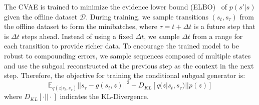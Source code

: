 The CVAE is trained to minimize the evidence lower bound (ELBO)~\citep{kingma2014vae} of $p(s' | s)$ given the offline dataset $\mathcal{D}$. During training, we sample transitions $(s_t, s_{\tau})$ from the offline dataset to form the minibatches, where $\tau = t + \Delta t$ is a future step that is $\Delta t$ steps ahead. Instead of using a fixed $\Delta t$, we sample $\Delta t$ from a range for each transition to provide richer data. To encourage the trained model to be robust to compounding errors, we sample sequences composed of multiple states and use the subgoal reconstructed at the previous step as the context in the next step. Therefore, the objective for training the conditional subgoal generator is:
\begin{equation}
    \mathbb{E}_{q(z | s_t, s_{\tau})}||s_{\tau} - g(s_t, z)||^2 + \ensuremath{D_{KL}[q(z | s_t, s_{\tau}) || p(z)]}
    \label{eqn:elbo}
\end{equation}
where $\ensuremath{D_{KL}[\cdot || \cdot]}$ indicates the KL-Divergence.



